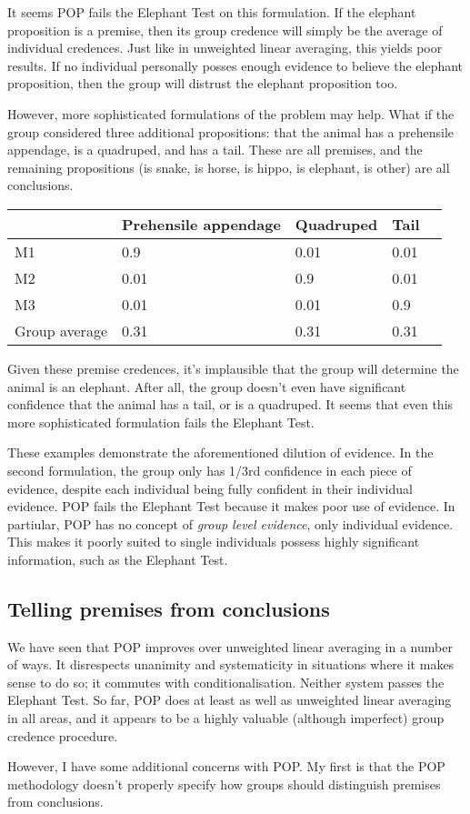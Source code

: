 \documentclass{article}
\begin{document}
It seems POP fails the Elephant Test on this formulation. If the elephant proposition is a premise, then its group credence will simply be the average of individual credences. Just like in unweighted linear averaging, this yields poor results. If no individual personally posses enough evidence to believe the elephant proposition, then the group will distrust the elephant proposition too.

However, more sophisticated formulations of the problem may help. What if the group considered three additional propositions: that the animal has a prehensile appendage, is a quadruped, and has a tail. These are all premises, and the remaining propositions (is snake, is horse, is hippo, is elephant, is other) are all conclusions.

\begin{center}
\begin{tabular}{ | l | l | l | l | l | }
  \hline 
     & Prehensile appendage & Quadruped & Tail\\ \hline
  M1 & 0.9 & 0.01 & 0.01 \\ \hline
  M2 & 0.01 & 0.9 & 0.01 \\ \hline
  M3 & 0.01 & 0.01 & 0.9 \\ \hline
  Group average & 0.31 & 0.31 & 0.31 \\ \hline
\end{tabular}
\end{center}

Given these premise credences, it's implausible that the group will determine the animal is an elephant. After all, the group doesn't even have significant confidence that the animal has a tail, or is a quadruped. It seems that even this more sophisticated formulation fails the Elephant Test. 

These examples demonstrate the aforementioned dilution of evidence. In the second formulation, the group only has 1/3rd confidence in each piece of evidence, despite each individual being fully confident in their individual evidence. POP fails the Elephant Test because it makes poor use of evidence. In partiular, POP has no concept of \textit{group level evidence}, only individual evidence. This makes it poorly suited to single individuals possess highly significant information, such as the Elephant Test.

\subsection{Telling premises from conclusions}

We have seen that POP improves over unweighted linear averaging in a number of ways. It disrespects unanimity and systematicity in situations where it makes sense to do so; it commutes with conditionalisation. Neither system passes the Elephant Test. So far, POP does at least as well as unweighted linear averaging in all areas, and it appears to be a highly valuable (although imperfect) group credence procedure.

However, I have some additional concerns with POP. My first is that the POP methodology doesn't properly specify how groups should distinguish premises from conclusions. 




\end{document}

